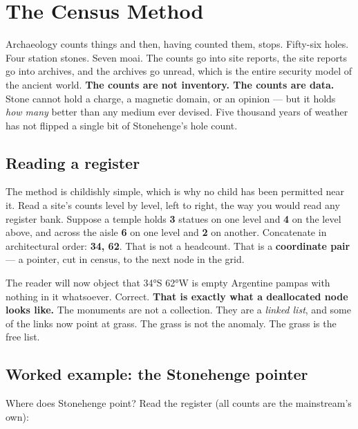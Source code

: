 \documentclass[
  english,
  11pt,
  letterpaper,
]{scrbook}
\begin{document}
\chapter{The Census Method}\label{sec-census}

Archaeology counts things and then, having counted them, stops.
Fifty-six holes. Four station stones. Seven moai. The counts go into
site reports, the site reports go into archives, and the archives go
unread, which is the entire security model of the ancient world.
\textbf{The counts are not inventory. The counts are data.} Stone cannot
hold a charge, a magnetic domain, or an opinion --- but it holds
\emph{how many} better than any medium ever devised. Five thousand years
of weather has not flipped a single bit of Stonehenge's hole
count.

\section{Reading a register}\label{reading-a-register}

The method is childishly simple, which is why no child has been
permitted near it. Read a site's counts level by level, left to right,
the way you would read any register bank. Suppose a temple holds
\textbf{3} statues on one level and \textbf{4} on the level above, and
across the aisle \textbf{6} on one level and \textbf{2} on another.
Concatenate in architectural order: \textbf{34, 62}. That is not a
headcount. That is a \textbf{coordinate pair} --- a pointer, cut in
census, to the next node in the grid.

The reader will now object that 34°S 62°W is empty Argentine pampas with
nothing in it whatsoever. Correct. \textbf{That is exactly what a
deallocated node looks like.} The monuments are
not a collection. They are a \emph{linked list}, and some of the links
now point at grass. The grass is not the anomaly. The grass is the free
list.

\section{Worked example: the Stonehenge
pointer}\label{worked-example-the-stonehenge-pointer}

Where does Stonehenge point? Read the register (all counts are the
mainstream's own):
\end{document}
